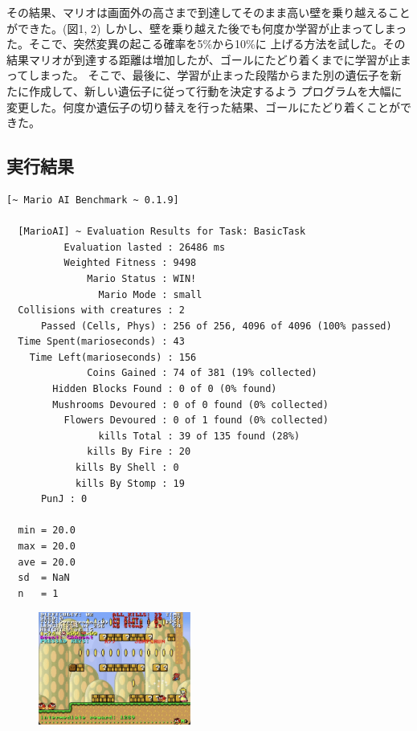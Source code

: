 \documentclass[a4paper,11pt]{jsarticle}
\begin{document}
{その結果、マリオは画面外の高さまで到達してそのまま高い壁を乗り越えることができた。(図1, 2)
しかし、壁を乗り越えた後でも何度か学習が止まってしまった。そこで、突然変異の起こる確率を5\%から10\%に
上げる方法を試した。その結果マリオが到達する距離は増加したが、ゴールにたどり着くまでに学習が止まってしまった。
そこで、最後に、学習が止まった段階からまた別の遺伝子を新たに作成して、新しい遺伝子に従って行動を決定するよう
プログラムを大幅に変更した。何度か遺伝子の切り替えを行った結果、ゴールにたどり着くことができた。

\subsection*{実行結果}

\begin{lstlisting}[caption=実行結果]
  [~ Mario AI Benchmark ~ 0.1.9]

  [MarioAI] ~ Evaluation Results for Task: BasicTask
          Evaluation lasted : 26486 ms
          Weighted Fitness : 9498
              Mario Status : WIN!
                Mario Mode : small
  Collisions with creatures : 2
      Passed (Cells, Phys) : 256 of 256, 4096 of 4096 (100% passed)
  Time Spent(marioseconds) : 43
    Time Left(marioseconds) : 156
              Coins Gained : 74 of 381 (19% collected)
        Hidden Blocks Found : 0 of 0 (0% found)
        Mushrooms Devoured : 0 of 0 found (0% collected)
          Flowers Devoured : 0 of 1 found (0% collected)
                kills Total : 39 of 135 found (28%)
              kills By Fire : 20
            kills By Shell : 0
            kills By Stomp : 19
      PunJ : 0

  min = 20.0
  max = 20.0
  ave = 20.0
  sd  = NaN
  n   = 1
\end{lstlisting}

\begin{figure}
  \begin{center}
    \includegraphics*[width=50mm]{images/report4/reaching-goal1.png}
  \end{center}
\end{figure}

}
\end{document}
